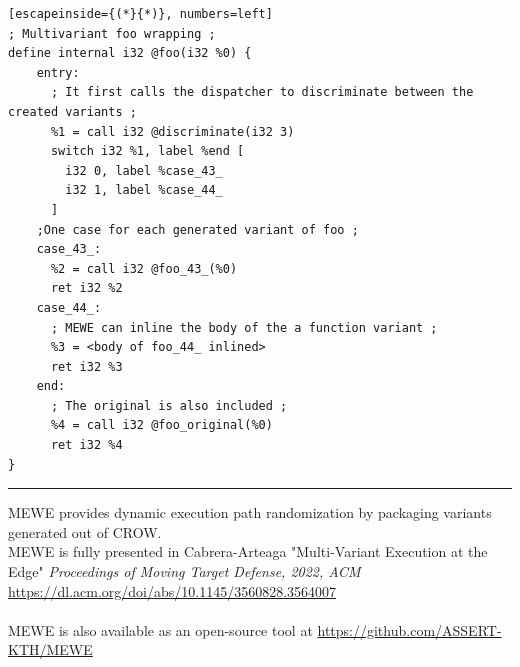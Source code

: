 \lstset{
    language=llvm,
    basicstyle=\footnotesize\ttfamily,
    columns=fullflexible,
    breaklines=true,
    numbers=none,
    stepnumber=1,
    float
}

\begin{minipage}[t]{0.9\linewidth}
\scriptsize
\centering
\noindent\begin{minipage}[b]{\linewidth}
    \begin{minipage}[t]{1\linewidth}
        \begin{lstlisting}[escapeinside={(*}{*)}, numbers=left]
; Multivariant foo wrapping ;
define internal i32 @foo(i32 %0) {
    entry:
      ; It first calls the dispatcher to discriminate between the created variants ;
      %1 = call i32 @discriminate(i32 3)
      switch i32 %1, label %end [
        i32 0, label %case_43_
        i32 1, label %case_44_
      ]
    ;One case for each generated variant of foo ;
    case_43_:                 
      %2 = call i32 @foo_43_(%0)
      ret i32 %2
    case_44_:
      ; MEWE can inline the body of the a function variant ;
      %3 = <body of foo_44_ inlined>
      ret i32 %3
    end:                                  
      ; The original is also included ;           
      %4 = call i32 @foo_original(%0)
      ret i32 %4
}
        \end{lstlisting}
    \end{minipage}%
    
    \noindent\rule{\linewidth}{0.4pt}
    \label{listing:multivariant_template}
\end{minipage}
\end{minipage}






\begin{tcolorbox}[title=Contribution paper and artifact,boxrule=1pt,arc=.2em,boxsep=1.0mm]
  MEWE provides dynamic execution path randomization by packaging variants generated out of CROW.\\
  MEWE is fully presented in Cabrera-Arteaga \etal "Multi-Variant Execution at the Edge"
  \emph{Proceedings of Moving Target Defense, 2022, ACM}
 \url{https://dl.acm.org/doi/abs/10.1145/3560828.3564007}
 \\\\
 MEWE is also available as an open-source tool at \url{https://github.com/ASSERT-KTH/MEWE}
\end{tcolorbox}